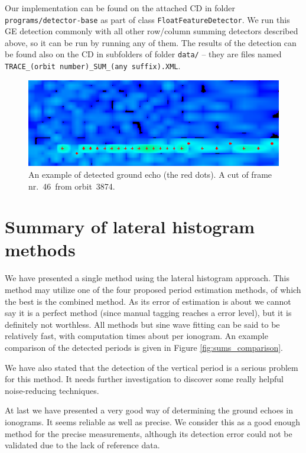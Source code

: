 Our implementation can be found on the attached CD in folder \texttt{programs/detector-base} as part of class \texttt{FloatFeatureDetector}. We run this GE detection commonly with all other row/column summing detectors described above, so it can be run by running any of them. The results of the detection can be found also on the CD in subfolders of folder \texttt{data/} -- they are files named \texttt{TRACE\_(orbit number)\_SUM\_(any suffix).XML}.

\begin{figure}
	\centering
	\includegraphics[width=140mm]{images/ground_echo_detected.png}
	\caption{An example of detected ground echo (the red dots). A cut of frame nr.~46~from orbit~3874.}
	\label{fig:ground_echo_detected}
\end{figure}

\section{Summary of lateral histogram methods}
We have presented a single method using the lateral histogram approach. This method may utilize one of the four proposed period estimation methods, of which the best is the combined method. As its error of estimation is about  we cannot say it is a perfect method (since manual tagging reaches a  error level), but it is definitely not worthless. All methods but sine wave fitting can be said to be relatively fast, with computation times about  per ionogram. An example comparison of the detected periods is given in Figure \ref{fig:sums_comparison}.

We have also stated that the detection of the vertical period is a serious problem for this method. It needs further investigation to discover some really helpful noise-reducing techniques.

At last we have presented a very good way of determining the ground echoes in ionograms. It seems reliable as well as precise. We consider this as a good enough method for the precise measurements, although its detection error could not be validated due to the lack of reference data.

